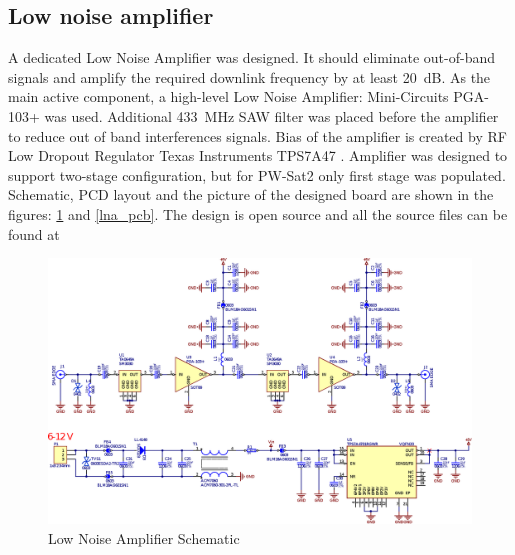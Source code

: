 \subsection{Low noise amplifier}
A dedicated Low Noise Amplifier was designed. It should eliminate out-of-band signals and amplify the required downlink frequency by at least \SI{20}{\dB}. As the main active component, a high-level Low Noise Amplifier: Mini-Circuits PGA-103+ \cite{lna_pga_datasheet} was used. Additional \SI{433}{\MHz} SAW filter was placed before the amplifier to reduce out of band interferences signals. Bias of the amplifier is created by RF Low Dropout Regulator Texas Instruments TPS7A47 \cite{lna_ldo_datasheet}. Amplifier was designed to support two-stage configuration, but for PW-Sat2 only first stage was populated. Schematic, PCD layout and the picture of the designed board are shown in the figures: \ref{lna_schematic} and \ref{lna_pcb}. The design is open source and all the source files can be found at \cite{lna_github}

\begin{figure}[H]
    \centering
    \includegraphics[width=0.8\paperwidth]{img/5/lna_schematic.eps}
    \caption{Low Noise Amplifier Schematic}
    \label{lna_schematic}
\end{figure}

